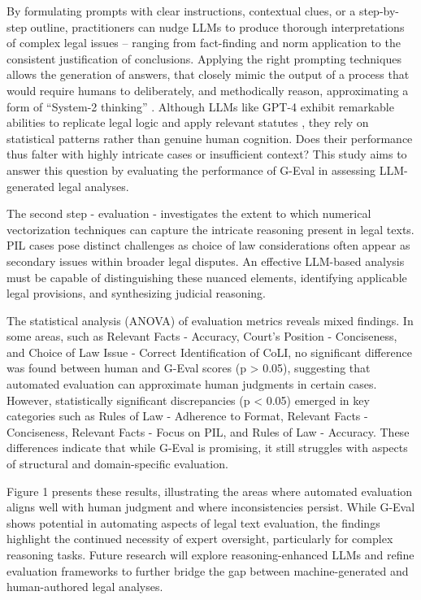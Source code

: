 \documentclass[a4paper,12pt]{article}
\begin{document}
By formulating prompts with clear instructions, contextual clues, or a step-by-step outline, practitioners can nudge LLMs to produce thorough interpretations of complex legal issues – ranging from fact-finding and norm application to the consistent justification of conclusions. Applying the right prompting techniques allows the generation of answers, that closely mimic the output of a process that would require humans to deliberately, and methodically reason, approximating a form of “System-2 thinking” \citep{Alammar, Grootendorst}.  Although LLMs like GPT-4 exhibit remarkable abilities to replicate legal logic and apply relevant statutes \citep{Spaic, Jovanovic}, they rely on statistical patterns rather than genuine human cognition. Does their performance thus falter with highly intricate cases or insufficient context? This study aims to answer this question by evaluating the performance of G-Eval in assessing LLM-generated legal analyses.

The second step - evaluation - investigates the extent to which numerical vectorization techniques can capture the intricate reasoning present in legal texts. PIL cases pose distinct challenges as choice of law considerations often appear as secondary issues within broader legal disputes. An effective LLM-based analysis must be capable of distinguishing these nuanced elements, identifying applicable legal provisions, and synthesizing judicial reasoning.

The statistical analysis (ANOVA) of evaluation metrics reveals mixed findings. In some areas, such as Relevant Facts - Accuracy, Court’s Position - Conciseness, and Choice of Law Issue - Correct Identification of CoLI, no significant difference was found between human and G-Eval scores (p > 0.05), suggesting that automated evaluation can approximate human judgments in certain cases. However, statistically significant discrepancies (p < 0.05) emerged in key categories such as Rules of Law - Adherence to Format, Relevant Facts - Conciseness, Relevant Facts - Focus on PIL, and Rules of Law - Accuracy. These differences indicate that while G-Eval is promising, it still struggles with aspects of structural and domain-specific evaluation.

Figure 1 presents these results, illustrating the areas where automated evaluation aligns well with human judgment and where inconsistencies persist. While G-Eval shows potential in automating aspects of legal text evaluation, the findings highlight the continued necessity of expert oversight, particularly for complex reasoning tasks. Future research will explore reasoning-enhanced LLMs and refine evaluation frameworks to further bridge the gap between machine-generated and human-authored legal analyses.
\end{document}

